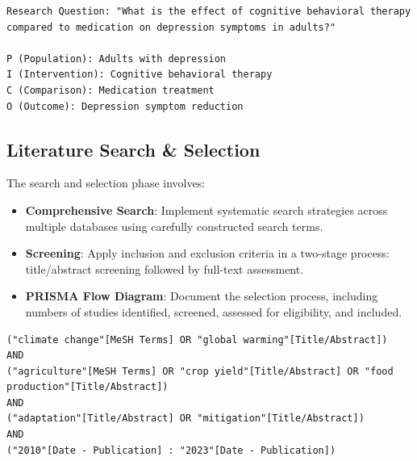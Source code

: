 \begin{infobox}
\begin{lstlisting}
Research Question: "What is the effect of cognitive behavioral therapy compared to medication on depression symptoms in adults?"

P (Population): Adults with depression
I (Intervention): Cognitive behavioral therapy
C (Comparison): Medication treatment
O (Outcome): Depression symptom reduction
\end{lstlisting}
\end{infobox}

\subsection{Literature Search \& Selection}

The search and selection phase involves:

\begin{itemize}
    \item \textbf{Comprehensive Search}: Implement systematic search strategies across multiple databases using carefully constructed search terms.
    \item \textbf{Screening}: Apply inclusion and exclusion criteria in a two-stage process: title/abstract screening followed by full-text assessment.
    \item \textbf{PRISMA Flow Diagram}: Document the selection process, including numbers of studies identified, screened, assessed for eligibility, and included.
\end{itemize}

\begin{infobox}
\begin{lstlisting}
("climate change"[MeSH Terms] OR "global warming"[Title/Abstract])
AND
("agriculture"[MeSH Terms] OR "crop yield"[Title/Abstract] OR "food production"[Title/Abstract])
AND
("adaptation"[Title/Abstract] OR "mitigation"[Title/Abstract])
AND
("2010"[Date - Publication] : "2023"[Date - Publication])
\end{lstlisting}
\end{infobox}

